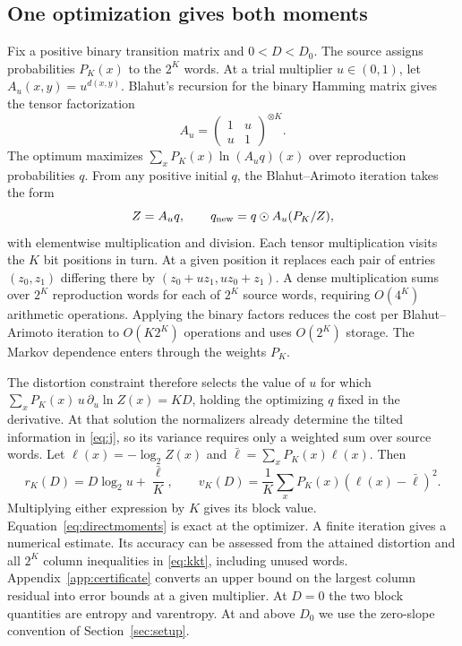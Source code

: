 \documentclass[11pt,letterpaper]{article}
\theoremstyle{definition}
\begin{document}
\subsection{One optimization gives both moments}\label{sec:compute}
Fix a positive binary transition matrix and $0<D<D_0$. The source assigns probabilities $P_K(x)$ to the $2^K$ words. At a trial multiplier $u\in(0,1)$, let $A_u(x,y)=u^{d(x,y)}$. Blahut's recursion for the binary Hamming matrix \cite[proof of Cor.~7]{blahut} gives the tensor factorization
\[
 A_u=\begin{pmatrix}1&u\\ u&1\end{pmatrix}^{\otimes K}.
\]
The optimum maximizes $\sum_x P_K(x)\ln (A_uq)(x)$ over reproduction probabilities $q$. From any positive initial $q$, the Blahut--Arimoto iteration takes the form \cite{blahut}
\[
 Z=A_u q,\qquad q_{\rm new}=q\odot A_u(P_K/Z),
\]
with elementwise multiplication and division. Each tensor multiplication visits the $K$ bit positions in turn. At a given position it replaces each pair of entries $(z_0,z_1)$ differing there by $(z_0+uz_1,uz_0+z_1)$. A dense multiplication sums over $2^K$ reproduction words for each of $2^K$ source words, requiring $O(4^K)$ arithmetic operations. Applying the binary factors reduces the cost per Blahut--Arimoto iteration to $O(K2^K)$ operations and uses $O(2^K)$ storage. The Markov dependence enters through the weights $P_K$.

The distortion constraint therefore selects the value of $u$ for which $\sum_x P_K(x)\,u\,\partial_u\ln Z(x)=KD$, holding the optimizing $q$ fixed in the derivative. At that solution the normalizers already determine the tilted information in \eqref{eq:j}, so its variance requires only a weighted sum over source words. Let $\ell(x)=-\log_2 Z(x)$ and $\bar\ell=\sum_x P_K(x)\ell(x)$. Then
\begin{equation}
 \boxed{\quad r_K(D)=D\log_2u+\frac{\bar\ell}{K},\qquad
 v_K(D)=\frac1K\sum_x P_K(x)(\ell(x)-\bar\ell)^2 .\quad}
 \label{eq:directmoments}
\end{equation}
Multiplying either expression by $K$ gives its block value. Equation~\eqref{eq:directmoments} is exact at the optimizer. A finite iteration gives a numerical estimate. Its accuracy can be assessed from the attained distortion and all $2^K$ column inequalities in \eqref{eq:kkt}, including unused words. Appendix~\ref{app:certificate} converts an upper bound on the largest column residual into error bounds at a given multiplier. At $D=0$ the two block quantities are entropy and varentropy. At and above $D_0$ we use the zero-slope convention of Section~\ref{sec:setup}.
\end{document}
